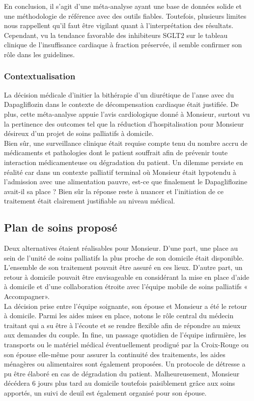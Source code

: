 En conclusion, il s’agit d’une méta-analyse ayant une base de données solide et une méthodologie de référence avec des outils fiables. Toutefois, plusieurs limites nous rappellent qu’il faut être vigilant quant à l’interprétation des résultats. Cependant, vu la tendance favorable des inhibiteurs SGLT$2$ sur le tableau clinique de l’insuffisance cardiaque à fraction préservée, il semble confirmer son rôle dans les guidelines. 

\subsubsection{Contextualisation} 
La décision médicale d’initier la bithérapie d’un diurétique de l’anse avec du Dapagliflozin dans le contexte de décompensation cardiaque était justifiée. De plus, cette méta-analyse appuie l’avis cardiologique donné à Monsieur, surtout vu la pertinence des outcomes tel que la réduction d’hospitalisation pour Monsieur désireux d’un projet de soins palliatifs à domicile.\\

Bien sûr, une surveillance clinique était requise compte tenu du nombre accru de médicaments et pathologies dont le patient souffrait afin de prévenir toute interaction médicamenteuse ou dégradation du patient. 
Un dilemme persiste en réalité car dans un contexte palliatif terminal où Monsieur était hypotendu à l’admission avec une alimentation pauvre, est-ce que finalement le Dapagliflozine avait-il sa place ? Bien sûr la réponse reste à nuancer et l’initiation de ce traitement était clairement justifiable au niveau médical. 

\subsection{Plan de soins proposé} 

Deux alternatives étaient réalisables pour Monsieur. D’une part, une place au sein de l’unité de soins palliatifs la plus proche de son domicile était disponible. L’ensemble de son traitement pouvait être assuré en ces lieux. D’autre part, un retour à domicile pouvait être envisageable en considérant la mise en place d’aide à domicile et d’une collaboration étroite avec l’équipe mobile de soins palliatifs « Accompagner».\\

La décision prise entre l’équipe soignante, son épouse et Monsieur a été le retour à domicile. Parmi les aides mises en place, notons le rôle central du médecin traitant qui a su être à l’écoute et se rendre flexible afin de répondre au mieux aux demandes du couple. In fine, un passage quotidien de l’équipe infirmière, les transports ou le matériel médical éventuellement prodigué par la Croix-Rouge ou son épouse elle-même pour assurer la continuité des traitements, les aides ménagères ou alimentaires sont également proposées. Un protocole de détresse a pu être élaboré en cas de dégradation du patient. Malheureusement, Monsieur décédera 6 jours plus tard au domicile toutefois paisiblement grâce aux soins apportés, un suivi de deuil est également organisé pour son épouse.\\

